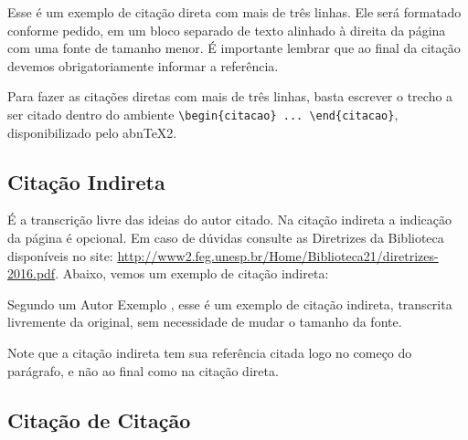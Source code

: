 \documentclass[
  12pt,		%
  a4paper,	%
  openright,%
  oneside,	%
  chapter=TITLE,		%
  section=TITLE,		%
  english,	%
  french,	%
  spanish,	%
  brazil
]{abntex2}
\begin{document}
            
            
             \begin{citacao}
             Esse é um exemplo de citação direta com mais de três linhas. Ele será formatado conforme pedido, em um bloco separado de texto alinhado à direita da página com uma fonte de tamanho menor. É importante lembrar que ao final da citação devemos obrigatoriamente informar a referência. \cite[p.~3--4]{livro}
             \end{citacao}
             
             Para fazer as citações diretas com mais de três linhas, basta escrever o trecho a ser citado dentro do ambiente \verb|\begin{citacao} ... \end{citacao}|, disponibilizado pelo abn\TeX2.
             
             
        \subsection{Citação Indireta}
        
            É a transcrição livre das ideias do autor citado. Na citação indireta a indicação da página é opcional. Em caso de dúvidas consulte as Diretrizes da Biblioteca disponíveis no site: \url{http://www2.feg.unesp.br/Home/Biblioteca21/diretrizes-2016.pdf}. Abaixo, vemos um exemplo de citação indireta:
            
            Segundo um Autor Exemplo \cite{livro}, esse é um exemplo de citação indireta, transcrita livremente da original, sem necessidade de mudar o tamanho da fonte.
            
            Note que a citação indireta tem sua referência citada logo no começo do parágrafo, e não ao final como na citação direta.
            
        \subsection{Citação de Citação}
            
\end{document}
